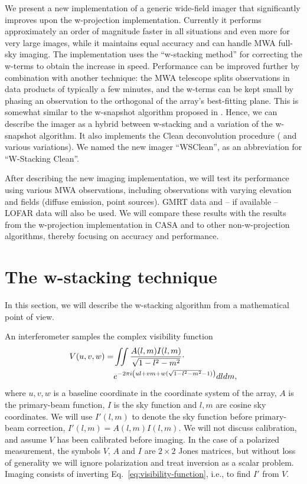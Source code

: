 \documentclass[useAMS,usenatbib]{mn2e}
\begin{document}
We present a new implementation of a generic wide-field imager that significantly improves upon the w-projection implementation. Currently it performs approximately an order of magnitude faster in all situations and even more for very large images, while it maintains equal accuracy and can handle MWA full-sky imaging. The implementation uses the ``w-stacking method'' for correcting the w-terms \citep{widefield-imaging-ska-cornwell} to obtain the increase in speed. Performance can be improved further by combination with another technique: the MWA telescope splits observations in data products of typically a few minutes, and the w-terms can be kept small by phasing an observation to the orthogonal of the array's best-fitting plane. This is somewhat similar to the w-snapshot algorithm proposed in \citet{widefield-imaging-ska-cornwell}. Hence, we can describe the imager as a hybrid between w-stacking and a variation of the w-snapshot algorithm. It also implements the Clean deconvolution procedure (\citealt{hogbom-clean} and various variations). We named the new imager ``WSClean'', as an abbreviation for ``W-Stacking Clean''.

After describing the new imaging implementation, we will test its performance using various MWA observations, including observations with varying elevation and fields (diffuse emission, point sources). GMRT data and -- if available -- LOFAR data will also be used. We will compare these results with the results from the w-projection implementation in CASA and to other non-w-projection algorithms, thereby focusing on accuracy and performance.

\section{The w-stacking technique}
In this section, we will describe the w-stacking algorithm from a mathematical point of view.

An interferometer samples the complex visibility function
\begin{align}\notag
V(u,v,w) = & \iint \frac{A(l,m) I(l,m)}{\sqrt{1-l^2-m^2}} \cdot \\ \label{eq:visibility-function}
& e^{-2\pi i \left(ul + vm + w(\sqrt{1-l^2-m^2}-1)\right)} dl dm,
\end{align}
where $u,v,w$ is a baseline coordinate in the coordinate system of the array, $A$ is the primary-beam function, $I$ is the sky function and $l,m$ are cosine sky coordinates. We will use $I'(l,m)$ to denote the sky function before primary-beam correction, $I'(l,m)=A(l,m)I(l,m)$. We will not discuss calibration, and assume $V$ has been calibrated before imaging. In the case of a polarized measurement, the symbols $V$, $A$ and $I$ are $2\times 2$ Jones matrices, but without loss of generality we will ignore polarization and treat inversion as a scalar problem. Imaging consists of inverting Eq.~\eqref{eq:visibility-function}, i.e., to find $I'$ from $V$.
\end{document}
